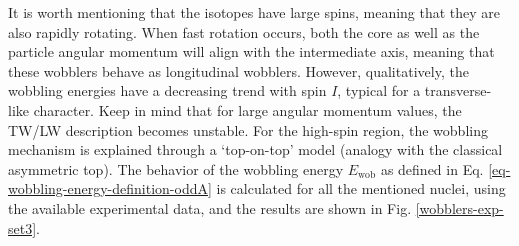 It is worth mentioning that the isotopes have large spins, meaning that they are also rapidly rotating. When fast rotation occurs, both the core as well as the particle angular momentum will align with the intermediate axis, meaning that these wobblers behave as longitudinal wobblers. However, qualitatively, the wobbling energies have a decreasing trend with spin $I$, typical for a transverse-like character. Keep in mind that for large angular momentum values, the TW/LW description becomes unstable. For the high-spin region, the wobbling mechanism is explained through a `top-on-top' model \cite{hamamoto2002wobbling,tanabe2006algebraic} (analogy with the classical asymmetric top). The behavior of the wobbling energy $E_\text{wob}$ as defined in Eq. \ref{eq-wobbling-energy-definition-oddA} is calculated for all the mentioned nuclei, using the available experimental data, and the results are shown in Fig. \ref{wobblers-exp-set3}.
